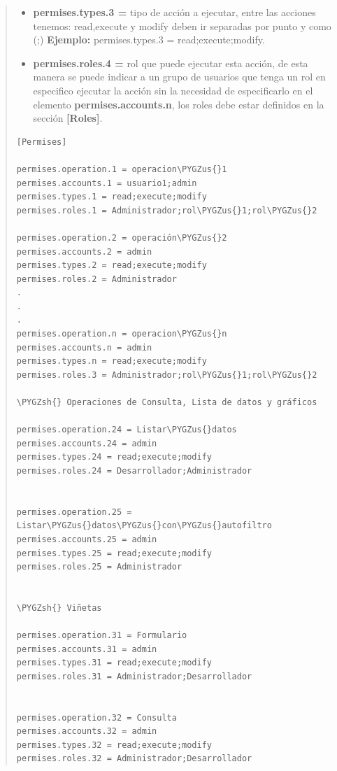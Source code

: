 \documentclass[letterpaper,11pt,spanish]{sphinxmanual}
\def\PYGZus{\char`\_}
\def\PYGZsh{\char`\#}
\begin{document}
\begin{quote}
\begin{itemize}
\item {} 
\textbf{permises.types.3 =} tipo de acción a ejecutar, entre las acciones tenemos: read,execute y modify deben ir separadas por punto y como (;) \textbf{Ejemplo:} permises.types.3 = read;execute;modify.

\item {} 
\textbf{permises.roles.4 =} rol que puede ejecutar esta acción, de esta manera se puede indicar a un grupo de usuarios que tenga un rol en especifico ejecutar la acción sin la necesidad de especificarlo en el elemento \textbf{permises.accounts.n}, los roles debe estar definidos en la sección \textbf{{[}Roles{]}}.

\end{itemize}

\begin{Verbatim}[commandchars=\\\{\}]
[Permises]

permises.operation.1 = operacion\PYGZus{}1
permises.accounts.1 = usuario1;admin
permises.types.1 = read;execute;modify
permises.roles.1 = Administrador;rol\PYGZus{}1;rol\PYGZus{}2

permises.operation.2 = operación\PYGZus{}2
permises.accounts.2 = admin
permises.types.2 = read;execute;modify
permises.roles.2 = Administrador
.
.
.
permises.operation.n = operacion\PYGZus{}n
permises.accounts.n = admin
permises.types.n = read;execute;modify
permises.roles.3 = Administrador;rol\PYGZus{}1;rol\PYGZus{}2

\PYGZsh{} Operaciones de Consulta, Lista de datos y gráficos

permises.operation.24 = Listar\PYGZus{}datos
permises.accounts.24 = admin
permises.types.24 = read;execute;modify
permises.roles.24 = Desarrollador;Administrador


permises.operation.25 = Listar\PYGZus{}datos\PYGZus{}con\PYGZus{}autofiltro
permises.accounts.25 = admin
permises.types.25 = read;execute;modify
permises.roles.25 = Administrador


\PYGZsh{} Viñetas

permises.operation.31 = Formulario
permises.accounts.31 = admin
permises.types.31 = read;execute;modify
permises.roles.31 = Administrador;Desarrollador


permises.operation.32 = Consulta
permises.accounts.32 = admin
permises.types.32 = read;execute;modify
permises.roles.32 = Administrador;Desarrollador
\end{Verbatim}
\end{quote}
\end{document}

